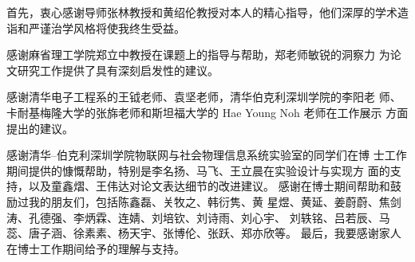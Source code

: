 
\begin{acknowledgements}
  首先，衷心感谢导师张林教授和黄绍伦教授对本人的精心指导，他们深厚的学术造诣和严谨治学风格将使我终生受益。

  感谢麻省理工学院郑立中教授在课题上的指导与帮助，郑老师敏锐的洞察力 为论文研究工作提供了具有深刻启发性的建议。

  感谢清华电子工程系的王钺老师、袁坚老师，清华伯克利深圳学院的李阳老 师、卡耐基梅隆大学的张旆老师和斯坦福大学的 Hae Young Noh 老师在工作展示 方面提出的建议。

  感谢清华–伯克利深圳学院物联网与社会物理信息系统实验室的同学们在博 士工作期间提供的慷慨帮助，特别是李名扬、马飞、王立晨在实验设计与实现方 面的支持，以及童鑫熠、王伟达对论文表达细节的改进建议。
感谢在博士期间帮助和鼓励过我的朋友们，包括陈鑫磊、关牧之、韩衍隽、黄 星煜、黄延、姜蔚蔚、焦剑涛、孔德强、李炳霖、连婧、刘培钦、刘诗雨、刘心宇、 刘轶铭、吕若辰、马蕊、唐子涵、徐素素、杨天宇、张博伦、张跃、郑亦欣等。
  最后，我要感谢家人在博士工作期间给予的理解与支持。
\end{acknowledgements}
